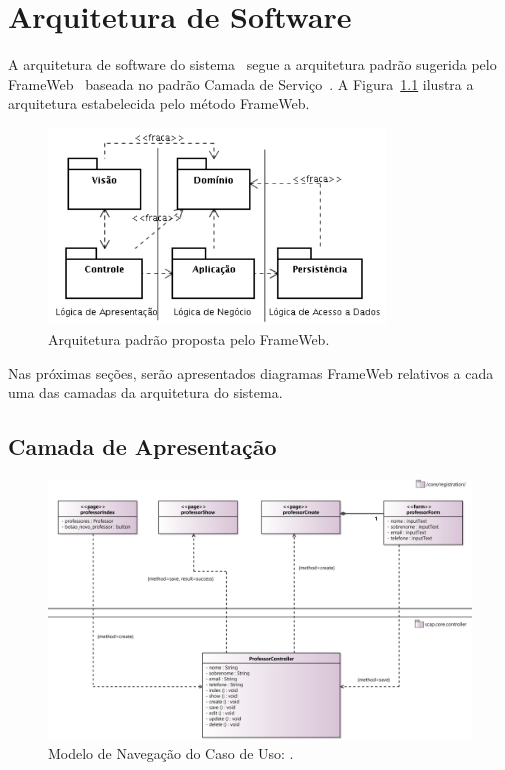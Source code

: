 
\chapter{Arquitetura de Software}
\label{sec-arquitetura}

A arquitetura de software do sistema~\imprimirtitulo \,\,segue a arquitetura padrão sugerida pelo FrameWeb~\cite{souza:masterthesis07,souza-et-al:iism09} baseada no padrão Camada de Serviço~\cite{fowler:book02}. A Figura~\ref{figura-arquitetura-padrao} ilustra a arquitetura estabelecida pelo método FrameWeb.

\begin{figure}[h]
	\centering
	\includegraphics[width=0.8\textwidth]{figuras/figura-arquitetura-padrao.png}
	\caption{Arquitetura padrão proposta pelo FrameWeb.}
	\label{figura-arquitetura-padrao}
\end{figure}

Nas próximas seções, serão apresentados diagramas FrameWeb relativos a cada uma das camadas da arquitetura do sistema.


\section{Camada de Apresentação}
\label{sec-arquitetura-apresentacao}


\begin{figure}[h]
	\centering
	\includegraphics[width=1\textwidth]{figuras/figura-arquitetura-navegacao1.png}
	\caption{Modelo de Navegação do Caso de Uso: .}
	\label{figura-arquitetura-navegacao1}
\end{figure}

